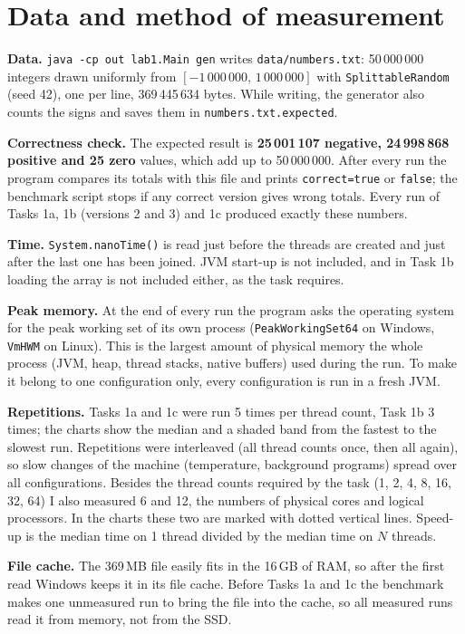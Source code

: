\section{Data and method of measurement}

\textbf{Data.} \texttt{java -cp out lab1.Main gen} writes \texttt{data/numbers.txt}: 50\,000\,000
integers drawn uniformly from $[-1\,000\,000,\,1\,000\,000]$ with \texttt{SplittableRandom}
(seed 42), one per line, 369\,445\,634 bytes. While writing, the generator also counts the signs
and saves them in \texttt{numbers.txt.expected}.

\textbf{Correctness check.} The expected result is
\textbf{25\,001\,107 negative, 24\,998\,868 positive and 25 zero} values, which add up to
50\,000\,000. After every run the program compares its totals with this file and prints
\texttt{correct=true} or \texttt{false}; the benchmark script stops if any correct version gives
wrong totals. Every run of Tasks 1a, 1b (versions 2 and 3) and 1c produced exactly these
numbers.

\textbf{Time.} \texttt{System.nanoTime()} is read just before the threads are created and just
after the last one has been joined. JVM start-up is not included, and in Task 1b loading the array
is not included either, as the task requires.

\textbf{Peak memory.} At the end of every run the program asks the operating system for the peak
working set of its own process (\texttt{PeakWorkingSet64} on Windows, \texttt{VmHWM} on Linux).
This is the largest amount of physical memory the whole process (JVM, heap, thread stacks, native
buffers) used during the run. To make it belong to one configuration only, every configuration is
run in a fresh JVM.

\textbf{Repetitions.} Tasks 1a and 1c were run 5 times per thread count, Task 1b 3 times; the charts show the median and a shaded band from the fastest to the
slowest run. Repetitions were interleaved (all thread counts once, then all again), so slow
changes of the machine (temperature, background programs) spread over all configurations. Besides
the thread counts required by the task (1, 2, 4, 8, 16, 32, 64) I also measured 6 and 12, the
numbers of physical cores and logical processors. In the charts these two are marked with dotted
vertical lines. Speed-up is the median time on 1 thread divided by the median time on $N$ threads.

\textbf{File cache.} The 369\,MB file easily fits in the 16\,GB of RAM, so after the first read
Windows keeps it in its file cache. Before Tasks 1a and 1c the benchmark makes one unmeasured run
to bring the file into the cache, so all measured runs read it from memory, not from the SSD.
